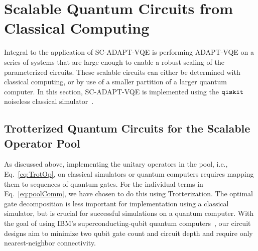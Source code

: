 \documentclass[aps, pra, onecolumn, tightenlines, letterpaper, amsmath, amssymb, preprintnumbers, floatfix, longbibliography, nofootinbib]{revtex4-2}
\begin{document}
\section{Scalable Quantum Circuits from Classical Computing}
\label{sec:ClassSim}
\noindent
Integral to the application of SC-ADAPT-VQE 
is performing ADAPT-VQE on a series of systems that are large enough to enable a robust scaling of the parameterized circuits.
These scalable circuits can either be determined with classical computing, or by use of a smaller partition of a larger quantum computer.
In this section, 
SC-ADAPT-VQE is implemented using the ${\tt qiskit}$ noiseless classical simulator~\cite{IBMQ,qiskit}.




\subsection{Trotterized Quantum Circuits for the Scalable Operator Pool}
\noindent
As  discussed above, implementing the unitary operators in the pool, 
i.e., Eq.~\eqref{eq:TrotOp},
on classical simulators or quantum computers
requires mapping them to sequences of quantum gates.
For the individual terms in 
Eq.~\eqref{eq:poolComm}, 
we have chosen to do this using Trotterization.
The optimal gate decomposition 
is less important for implementation using a classical simulator,
but is crucial for successful simulations on a quantum computer.
With the goal of 
using IBM's superconducting-qubit quantum computers~\cite{IBMQ,qiskit},
our circuit designs aim to minimize two qubit gate count and circuit depth and require only nearest-neighbor connectivity.
\end{document}

